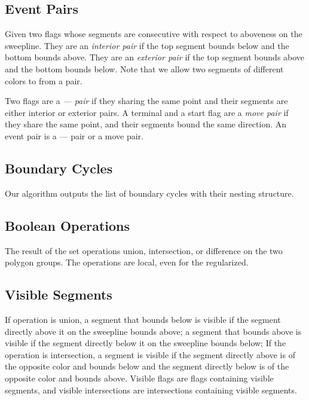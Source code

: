 \documentclass[11pt]{article}
\begin{document}
\subsection{Event Pairs}
Given two flags whose segments are consecutive with respect to aboveness on the sweepline.
They are an \textit{interior pair} if the top segment bounds below and the bottom bounds above.
They are an \textit{exterior pair} if the top segment bounds above and the bottom bounds below.
Note that we allow two segments of different colors to from a pair.

Two flags are a \textit{--- pair} if they sharing the same point and their segments are either interior or exterior pairs.
A terminal and a start flag are a \textit{move pair} if they share the same point, and their segments bound the same direction.
An event pair is a --- pair or a move pair.

\subsection{Boundary Cycles}
Our algorithm outputs the list of boundary cycles with their nesting structure.

\subsection{Boolean Operations}
The result of the set operations union, intersection, or difference on the two polygon groups.
The operations are local, even for the regularized. 

\subsection{Visible Segments}
If operation is union, a segment that bounds below is visible if the segment directly above it on the sweepline bounds above; a segment that bounds above is visible if the segment directly below it on the sweepline bounds below;
If the operation is intersection, a segment is visible if the segment directly above is of the opposite color and bounds below and the segment directly below is of the opposite color and bounds above.
Visible flags are flags containing visible segments, and visible intersections are intersections containing visible segments.
\end{document}
